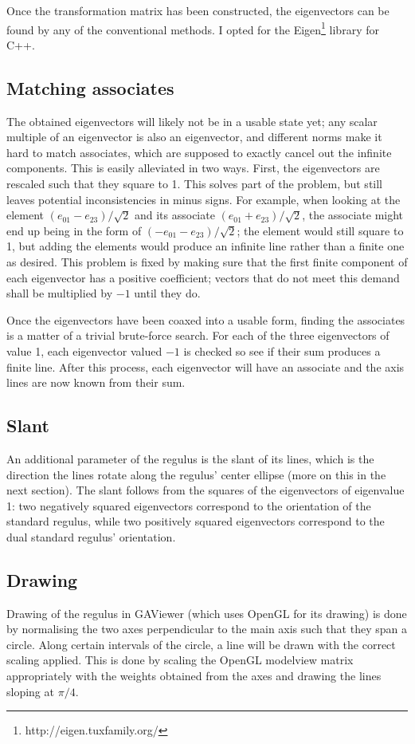 \documentclass[a4paper, 10pt]{article}
\begin{document}
Once the transformation matrix has been constructed, the eigenvectors can be
found by any of the conventional methods. I opted for the
Eigen\footnote{http://eigen.tuxfamily.org/} library for C++.

\subsection{Matching associates}
The obtained eigenvectors will likely not be in a usable state yet; any scalar
multiple of an eigenvector is also an eigenvector, and different norms make it
hard to match associates, which are supposed to exactly cancel out the infinite
components. This is easily alleviated in two ways. First, the eigenvectors are
rescaled such that they square to 1. This solves part of the problem, but still
leaves potential inconsistencies in minus signs. For example, when looking at
the element $(e_{01} - e_{23}) / \sqrt{2}$ and its associate $(e_{01} + e_{23})
/ \sqrt{2}$, the associate might end up being in the form of $(-e_{01} - e_{23})
/ \sqrt{2}$; the element would still square to 1, but adding the elements would
produce an infinite line rather than a finite one as desired.
This problem is fixed by making sure that the first finite component of each
eigenvector has a positive coefficient; vectors that do not meet this demand
shall be multiplied by $-1$ until they do.

Once the eigenvectors have been coaxed into a usable form, finding the
associates is a matter of a trivial brute-force search. For each of the three
eigenvectors of value 1, each eigenvector valued $-1$ is checked so see if their
sum produces a finite line. After this process, each eigenvector will have an
associate and the axis lines are now known from their sum.

\subsection{Slant}
An additional parameter of the regulus is the slant of its lines, which is the
direction the lines rotate along the regulus' center ellipse (more on this in
the next section). The slant follows from the squares of the eigenvectors of
eigenvalue 1: two negatively squared eigenvectors correspond to the orientation
of the standard regulus, while two positively squared eigenvectors correspond to
the dual standard regulus' orientation.

\subsection{Drawing}
Drawing of the regulus in GAViewer (which uses OpenGL for its drawing) is done
by normalising the two axes perpendicular to the main axis such that they span a
circle. Along certain intervals of the circle, a line will be drawn with the
correct scaling applied.  This is done by scaling the OpenGL modelview matrix
appropriately with the weights obtained from the axes and drawing the lines
sloping at $\pi / 4$.
\end{document}
